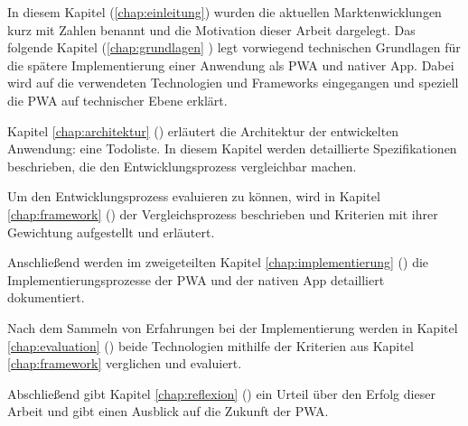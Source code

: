 In diesem Kapitel (\ref{chap:einleitung}) wurden die aktuellen Marktenwicklungen kurz mit Zahlen benannt und die Motivation dieser Arbeit dargelegt. Das folgende Kapitel (\ref{chap:grundlagen} ) legt vorwiegend technischen Grundlagen für die spätere Implementierung einer Anwendung als PWA und nativer App. Dabei wird auf die verwendeten Technologien und Frameworks eingegangen und speziell die PWA auf technischer Ebene erklärt. 

Kapitel \ref{chap:architektur} () erläutert die Architektur der entwickelten Anwendung: eine Todoliste. In diesem Kapitel werden detaillierte Spezifikationen beschrieben, die den Entwicklungsprozess vergleichbar machen. %

Um den Entwicklungsprozess evaluieren zu können, wird in Kapitel \ref{chap:framework} () der Vergleichsprozess beschrieben und Kriterien mit ihrer Gewichtung aufgestellt und erläutert. 

Anschließend werden im zweigeteilten Kapitel \ref{chap:implementierung} () die Implementierungsprozesse der PWA und der nativen App detailliert dokumentiert.

Nach dem Sammeln von Erfahrungen bei der Implementierung werden in Kapitel \ref{chap:evaluation} () beide Technologien mithilfe der Kriterien aus Kapitel \ref{chap:framework} verglichen und evaluiert.

Abschließend gibt Kapitel \ref{chap:reflexion} () ein Urteil über den Erfolg dieser Arbeit und gibt einen Ausblick auf die Zukunft der PWA.